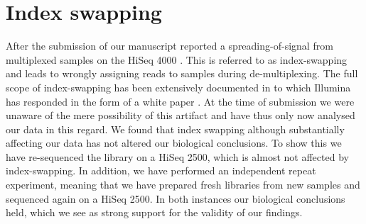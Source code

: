 \documentclass{article}
\begin{document}


\section*{Index swapping}
After the submission of our manuscript \citeauthor{Sinha2017} reported a spreading-of-signal from multiplexed samples on the HiSeq 4000 \autocite{Sinha2017}.
This is referred to as index-swapping and leads to wrongly assigning reads to samples during de-multiplexing.
The full scope of index-swapping has been extensively documented in \autocite{Sinha2017} to which Illumina has responded in the form of a white paper \autocite{Illumina}.
At the time of submission we were unaware of the mere possibility of this artifact and have thus only now analysed our data in this regard.
We found that index swapping although substantially affecting our data has not altered our biological conclusions.
To show this we have re-sequenced the library on a HiSeq 2500, which is almost not affected by index-swapping.
In addition, we have performed an independent repeat experiment, meaning that we have prepared fresh libraries from new samples and sequenced again on a HiSeq 2500.
In both instances our biological conclusions held, which we see as strong support for the validity of our findings.

\end{document}
